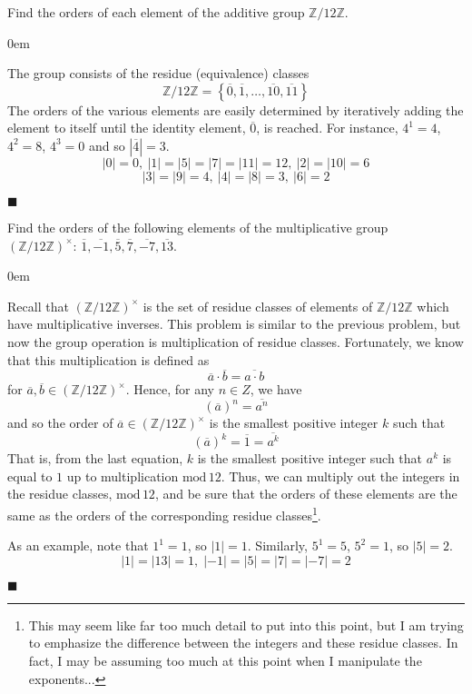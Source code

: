 \documentclass[12pt]{article}
\renewcommand{\qed}{\hfill$\blacksquare$}
\renewenvironment{proof}{\begin{addmargin}[1em]{0em}\begin{newproof}}{\end{newproof}\end{addmargin}\qed}
\newenvironment{problem}[2][Exercise]{\begin{trivlist}
\item[\hskip \labelsep {\bfseries #1}\hskip \labelsep {\bfseries #2.}]}{\end{trivlist}}
\begin{document}
\begin{problem}{1.1.11}
Find the orders of each element of the additive group $\mathbb{Z}/12\mathbb{Z}$.
\end{problem}
\begin{proof}
The group consists of the residue (equivalence) classes $$ \mathbb{Z}/12\mathbb{Z} = \left\{ \overline{0},\overline{1},\ldots,\overline{10},\overline{11}\right\} $$ The orders of the various elements are easily determined by iteratively adding the element to itself until the identity element, $\overline{0}$, is reached. For instance, $ 4^1 = 4$, $4^2 = 8$, $4^3 = 0$ and so $\left|\overline{4}\right|=3$.
 $$ \left| 0\right|=0, \> \left|1\right|=\left|5\right|=\left|7\right|=\left|11\right|=12, \> \left|2\right|=\left|10\right|=6 $$
 $$ \left|3\right|=\left|9\right|=4, \> \left|4\right|=\left|8\right|=3, \> \left|6\right| = 2 $$

\end{proof}

\begin{problem}{1.1.12}
Find the orders of the following elements of the multiplicative group $\left(\mathbb{Z}/12\mathbb{Z}\right)^{\times}: \, \overline{1},\overline{-1},\overline{5},\overline{7},\overline{-7},\overline{13}$.
\end{problem}
\begin{proof}
Recall that $\left(\mathbb{Z}/12\mathbb{Z}\right)^{\times}$ is the set of residue classes of elements of $\mathbb{Z}/12\mathbb{Z}$ which have multiplicative inverses. This problem is similar to the previous problem, but now the group operation is multiplication of residue classes. Fortunately, we know that this multiplication is defined as $$ \overline{a}\cdot \overline{b} = \overline{a\cdot b} $$ for $\overline{a}, \overline{b} \in \left(\mathbb{Z}/12\mathbb{Z}\right)^{\times}$. Hence, for any $n\in Z$, we have $$ \left(\overline{a}\right)^n = \overline{a^n} $$
and so the order of $\overline{a}\in \left(\mathbb{Z}/12\mathbb{Z}\right)^{\times}$ is the smallest positive integer $k$ such that
$$ \left(\overline{a}\right)^k = \overline{1} = \overline{a^k} $$ That is, from the last equation, $k$ is the smallest positive integer such that $a^k$ is equal to $1$ up to multiplication $\text{mod}\, 12$. Thus, we can multiply out the integers in the residue classes, $\text{mod}\, 12$, and be sure that the orders of these elements are the same as the orders of the corresponding residue classes\footnote{This may seem like far too much detail to put into this point, but I am trying to emphasize the difference between the integers and these residue classes. In fact, I may be assuming too much at this point when I manipulate the exponents...}.

As an example, note that $1^1 = 1$, so $\left|1\right| =1$. Similarly, $5^1=5$, $5^2 = 1$, so $\left|5\right|=2$.
$$ \left|1\right| = \left|13\right| = 1, \; \left|-1\right| = \left|5\right|=\left|7\right|=\left|-7\right|=2 $$
\end{proof}
\end{document}
